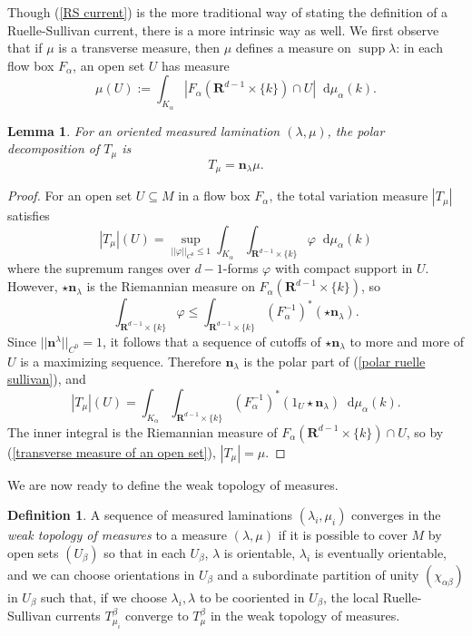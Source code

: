 \documentclass[reqno,10pt]{amsart}
\newcommand{\RR}{\mathbf{R}}
\newcommand*\dif{\mathop{}\!\mathrm{d}}
\DeclareMathOperator{\supp}{supp}
\newcommand{\normal}{\mathbf n}
\newcommand{\dfn}[1]{\emph{#1}\index{#1}}
\newtheorem{lemma}[theorem]{Lemma}
\theoremstyle{definition}
\newtheorem{definition}[theorem]{Definition}
\numberwithin{equation}{section}
\begin{document}
Though (\ref{RS current}) is the more traditional way of stating the definition of a Ruelle-Sullivan current, there is a more intrinsic way as well.
We first observe that if $\mu$ is a transverse measure, then $\mu$ defines a measure on $\supp \lambda$: in each flow box $F_\alpha$, an open set $U$ has measure 
\begin{equation}\label{transverse measure of an open set}
\mu(U) := \int_{K_\alpha} |F_\alpha(\RR^{d - 1} \times \{k\}) \cap U| \dif \mu_\alpha(k).
\end{equation}

\begin{lemma}
For an oriented measured lamination $(\lambda, \mu)$, the polar decomposition of $T_\mu$ is 
\begin{equation}\label{polar ruelle sullivan}
T_\mu = \normal_\lambda \mu.
\end{equation}
\end{lemma}
\begin{proof}
For an open set $U \subseteq M$ in a flow box $F_\alpha$, the total variation measure $|T_\mu|$ satisfies
$$|T_\mu|(U) = \sup_{||\varphi||_{C^0} \leq 1} \int_{K_\alpha} \int_{\RR^{d - 1} \times \{k\}} \varphi \dif \mu_\alpha(k)$$
where the supremum ranges over $d-1$-forms $\varphi$ with compact support in $U$.
However, $\star \normal_\lambda$ is the Riemannian measure on $F_\alpha(\RR^{d - 1} \times \{k\})$, so
$$\int_{\RR^{d - 1} \times \{k\}} \varphi \leq \int_{\RR^{d - 1} \times \{k\}} (F_\alpha^{-1})^*(\star \normal_\lambda).$$
Since $||\normal^\lambda||_{C^0} = 1$, it follows that a sequence of cutoffs of $\star \normal_\lambda$ to more and more of $U$ is a maximizing sequence.
Therefore $\normal_\lambda$ is the polar part of (\ref{polar ruelle sullivan}), and
$$|T_\mu|(U) = \int_{K_\alpha} \int_{\RR^{d - 1} \times \{k\}} (F_\alpha^{-1})^*(1_U \star \normal_\lambda) \dif \mu_\alpha(k).$$
The inner integral is the Riemannian measure of $F_\alpha(\RR^{d - 1} \times \{k\}) \cap U$, so by (\ref{transverse measure of an open set}), $|T_\mu| = \mu$.
\end{proof}

We are now ready to define the weak topology of measures.

\begin{definition}
A sequence of measured laminations $(\lambda_i, \mu_i)$ converges in the \dfn{weak topology of measures} to a measure $(\lambda, \mu)$ if it is possible to cover $M$ by open sets $(U_\beta)$ so that in each $U_\beta$, $\lambda$ is orientable, $\lambda_i$ is eventually orientable, and we can choose orientations in $U_\beta$ and a subordinate partition of unity $(\chi_{\alpha \beta})$ in $U_\beta$ such that, if we choose $\lambda_i, \lambda$ to be cooriented in $U_\beta$, the local Ruelle-Sullivan currents $T_{\mu_i}^\beta$ converge to $T_\mu^\beta$ in the weak topology of measures.
\end{definition}
\end{document}
